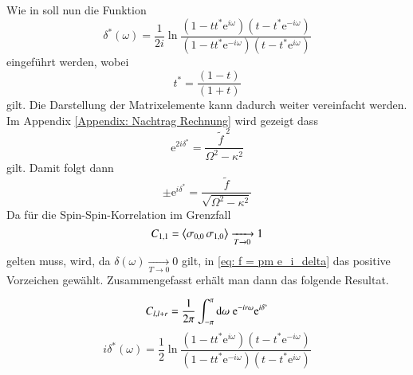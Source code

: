 \noindent Wie in \cite{Montroll_Potts_Ward} soll nun die Funktion
\begin{equation}
\delta^*(\omega) = \frac{1}{2i} \ln{\frac{(1-tt^*\mathrm{e}^{i\omega})(t-t^*\mathrm{e}^{-i\omega})}{(1-tt^*\mathrm{e}^{-i\omega})(t-t^*\mathrm{e}^{i\omega})}}
\end{equation}
eingeführt werden, wobei 
\begin{equation}
t^* = \frac{(1-t)}{(1+t)}
\end{equation}
gilt.  Die Darstellung der Matrixelemente kann dadurch weiter vereinfacht werden. Im Appendix \ref{Appendix: Nachtrag Rechnung} wird gezeigt dass
\begin{equation} \label{eq: Missing Equation 1}
\mathrm{e}^{2i\delta^*} = \frac{\tilde{f}^{\;2}}{\Omega^2 - \kappa^2}
\end{equation}
gilt. Damit folgt dann 
\begin{equation} \label{eq: f = pm e_i_delta}
\pm \mathrm{e}^{i\delta^*} = \frac{\tilde{f}}{\sqrt{\Omega^2 - \kappa^2}}
\end{equation}
Da für die Spin-Spin-Korrelation im Grenzfall
\begin{equation}
C_{1,1} = \left\langle \sigma_{0,0}\, \sigma_{1,0} \right\rangle \xrightarrow[ T \rightarrow 0 ]{} 1
\end{equation}
gelten muss, wird, da $\delta(\omega) \xrightarrow[ T \rightarrow 0 ]{} 0$ gilt, in \eqref{eq: f = pm e_i_delta} das positive Vorzeichen gewählt. Zusammengefasst erhält man dann das folgende Resultat.

\begin{grayframe}[frametitle = {Darstellung der Matrixelemente $C_{l,l+r}$ als Fourier-Koeffizienten}]
\begin{equation}
C_{l,l+r} = \frac{1}{2\pi} \int_{-\pi}^{\pi}\mathrm{d}\omega  \;\mathrm{e}^{-i  r \omega} \mathrm{e}^{i\delta^*}
\end{equation}
\begin{equation}
i\delta^*(\omega) = \frac{1}{2} \ln{\frac{(1-tt^*\mathrm{e}^{i\omega})(t-t^*\mathrm{e}^{-i\omega})}{(1-tt^*\mathrm{e}^{-i\omega})(t-t^*\mathrm{e}^{i\omega})}}
\end{equation}
\end{grayframe}


